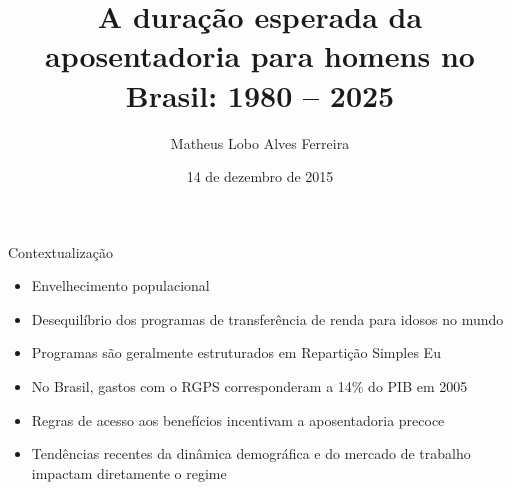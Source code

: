 \documentclass{beamer}
\title{A duração esperada da aposentadoria para homens no Brasil: 1980 -- 2025}
\author{Matheus Lobo Alves Ferreira}
\institute[UFMG]
\date{14 de dezembro de 2015}
\begin{document}
    
\begin{frame}[plain]
  \titlepage
\end{frame}

\begin{frame}{Contextualização}
	\begin{itemize}
		\item{Envelhecimento populacional }
		\item{Desequilíbrio dos programas de transferência de renda para idosos no mundo}
		\item{Programas são geralmente estruturados em Repartição Simples}
		Eu
		\item{No Brasil, gastos com o RGPS corresponderam a 14\% do PIB em 2005}
		\item{Regras de acesso aos benefícios incentivam a aposentadoria precoce}
		\item{Tendências recentes da dinâmica demográfica e do mercado de trabalho impactam diretamente o regime}
	\end{itemize}
\end{frame}
\end{document}
